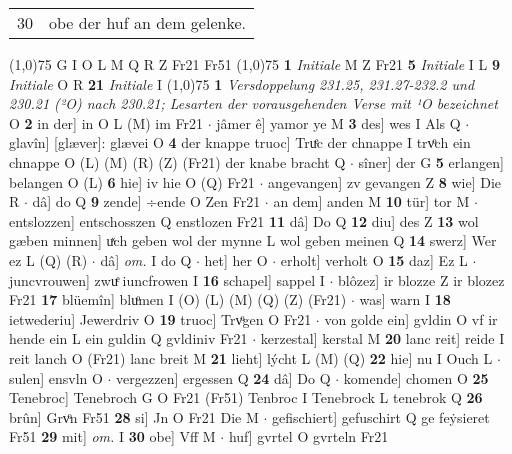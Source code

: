 \documentclass[8pt,a4paper,notitlepage]{article}
\begin{document}
\begin{table}[ht]
\begin{minipage}[t]{0.5\linewidth}
\begin{tabular}{rl}
30 & obe der huf an dem gelenke.\\ 
\end{tabular}
\scriptsize
\line(1,0){75} \newline
G I O L M Q R Z Fr21 Fr51 \newline
\line(1,0){75} \newline
\textbf{1} \textit{Initiale} M Z Fr21  \textbf{5} \textit{Initiale} I L  \textbf{9} \textit{Initiale} O R  \textbf{21} \textit{Initiale} I  \newline
\line(1,0){75} \newline
\textbf{1} \textit{Versdoppelung 231.25, 231.27-232.2 und 230.21 (²O) nach 230.21; Lesarten der vorausgehenden Verse mit ¹O bezeichnet} O  \textbf{2} in der] in O L (M) im Fr21  $\cdot$ jâmer ê] yamor ye M \textbf{3} des] wes I Als Q  $\cdot$ glavîn] [glæver]: glævei O \textbf{4} der knappe truoc] Truͤc der chnappe I trvͦch ein chnappe O (L) (M) (R) (Z) (Fr21) der knabe bracht Q  $\cdot$ sîner] der G \textbf{5} erlangen] belangen O (L) \textbf{6} hie] iv hie O (Q) Fr21  $\cdot$ angevangen] zv gevangen Z \textbf{8} wie] Die R  $\cdot$ dâ] do Q \textbf{9} zende] ÷ende O Zen Fr21  $\cdot$ an dem] anden M \textbf{10} tür] tor M  $\cdot$ entslozzen] entschosszen Q enstlozen Fr21 \textbf{11} dâ] Do Q \textbf{12} diu] des Z \textbf{13} wol gæben minnen] uͯch geben wol der mynne L wol geben meinen Q \textbf{14} swerz] Wer ez L (Q) (R)  $\cdot$ dâ] \textit{om.} I do Q  $\cdot$ het] her O  $\cdot$ erholt] verholt O \textbf{15} daz] Ez L  $\cdot$ juncvrouwen] zwuͤ iuncfrowen I \textbf{16} schapel] sappel I  $\cdot$ blôzez] ir blozze Z ir blozez Fr21 \textbf{17} blüemîn] bluͦmen I (O) (L) (M) (Q) (Z) (Fr21)  $\cdot$ was] warn I \textbf{18} ietwederiu] Jewerdriv O \textbf{19} truoc] Trvͦgen O Fr21  $\cdot$ von golde ein] gvldin O vf ir hende ein L ein guldin Q gvldiniv Fr21  $\cdot$ kerzestal] kerstal M \textbf{20} lanc reit] reide I reit lanch O (Fr21) lanc breit M \textbf{21} lieht] lýcht L (M) (Q) \textbf{22} hie] nu I Ouch L  $\cdot$ sulen] ensvln O  $\cdot$ vergezzen] ergessen Q \textbf{24} dâ] Do Q  $\cdot$ komende] chomen O \textbf{25} Tenebroc] Tenebroch G O Fr21 (Fr51) Tenbroc I Tenebrock L tenebrok Q \textbf{26} brûn] Grvͦn Fr51 \textbf{28} si] Jn O Fr21 Die M  $\cdot$ gefischiert] gefuschirt Q ge feẏsieret Fr51 \textbf{29} mit] \textit{om.} I \textbf{30} obe] Vff M  $\cdot$ huf] gvrtel O gvrteln Fr21 \newline
\end{minipage}
\hspace{0.5cm}
\begin{minipage}[t]{0.5\linewidth}

\end{minipage}
\end{table}
\end{document}

